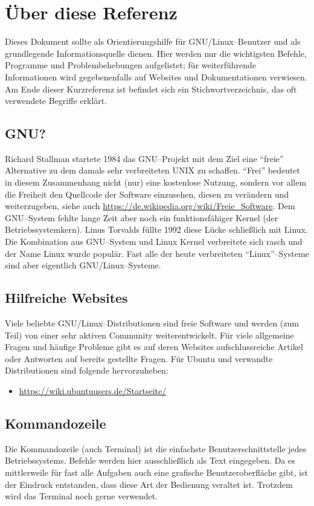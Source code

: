 \section {Über diese Referenz}
Dieses Dokument sollte als Orientierungshilfe für GNU/Linux--Benutzer und als grundlegende Informationsquelle dienen. Hier werden nur die wichtigsten Befehle, Programme und Problembehebungen aufgelistet; für weiterführende Informationen wird gegebenenfalls auf Websites und Dokumentationen verwiesen. Am Ende dieser Kurzreferenz ist befindet sich ein Stichwortverzeichnis, das oft verwendete Begriffe erklärt.

\subsection{GNU?}
Richard Stallman startete 1984 das GNU--Projekt mit dem Ziel eine ``freie'' Alternative zu dem damals sehr verbreiteten UNIX zu schaffen. ``Frei'' bedeutet in diesem Zusammenhang nicht (nur) eine kostenlose Nutzung, sondern vor allem die Freiheit den Quellcode der Software einzusehen, diesen zu verändern und weiterzugeben, siehe auch \url{https://de.wikipedia.org/wiki/Freie_Software}. Dem GNU--System fehlte lange Zeit aber noch ein funktionsfähiger Kernel (der Betriebssystemkern). Linus Torvalds füllte 1992 diese Lücke schließlich mit Linux. Die Kombination aus GNU--System und Linux Kernel verbreitete sich rasch und der Name Linux wurde populär. Fast alle der heute verbreiteten ``Linux''--Systeme sind aber eigentlich GNU/Linux--Systeme.

\subsection {Hilfreiche Websites}
Viele beliebte GNU/Linux--Distributionen sind freie Software und werden (zum Teil) von einer sehr aktiven Community weiterentwickelt. Für viele allgemeine Fragen und häufige Probleme gibt es auf deren Websites aufschlussreiche Artikel oder Antworten auf bereits gestellte Fragen. Für Ubuntu und verwandte Distributionen sind folgende hervorzuheben:

\begin{itemize}
	\item \url{https://wiki.ubuntuusers.de/Startseite/}
\end{itemize}

\subsection{Kommandozeile}
Die Kommandozeile (auch Terminal) ist die einfachste Benutzerschnittstelle jedes Betriebssystems. Befehle werden hier ausschließlich als Text eingegeben. Da es mittlerweile für fast alle Aufgaben auch eine grafische Benutzeroberfläche gibt, ist der Eindruck entstanden, dass diese Art der Bedienung veraltet ist. Trotzdem wird das Terminal noch gerne verwendet. %

